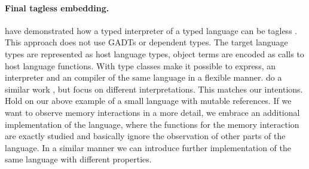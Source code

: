 %
%

%
%
%
%

\paragraph{Final tagless embedding.}
\citeauthor{final_tagless_embedding} have demonstrated how a typed interpreter of a typed language can be tagless \cite{final_tagless_embedding}. 
This approach does not use GADTs or dependent types. 
The target language types are represented as host language types, object terms are encoded as calls to host language functions. With type classes \citeauthor{final_tagless_embedding} make it possible to express, \eg an interpreter and an compiler of the same language in a flexible manner. 
\citeauthor{Hofer:2008:PED:1449913.1449935} do a similar work \cite{Hofer:2008:PED:1449913.1449935}, but focus on different interpretations.
This matches our intentions.
Hold on our above example of a small language with mutable references.
If we want to observe memory interactions in a more detail, we embrace an additional implementation of the language, where the functions for the memory interaction are exactly studied and basically ignore the observation of other parts of the language.
In a similar manner we can introduce further implementation of the same language with different properties.

